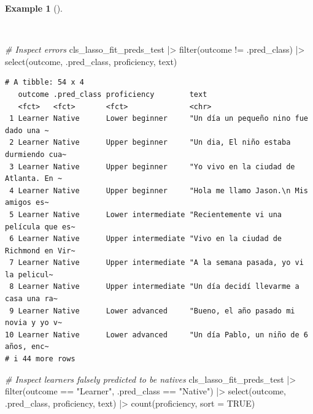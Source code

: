 \documentclass[
  letterpaper,
  krantz1]{latex/krantz-mod}
\newenvironment{Shaded}{\begin{snugshade}}{\end{snugshade}}
\newcommand{\AttributeTok}[1]{\textcolor[rgb]{0.00,0.00,0.00}{#1}}
\newcommand{\CommentTok}[1]{\textcolor[rgb]{0.00,0.00,0.00}{\textit{#1}}}
\newcommand{\ConstantTok}[1]{\textcolor[rgb]{0.00,0.00,0.00}{#1}}
\newcommand{\FunctionTok}[1]{\textcolor[rgb]{0.00,0.00,0.00}{#1}}
\newcommand{\NormalTok}[1]{\textcolor[rgb]{0.00,0.00,0.00}{#1}}
\newcommand{\SpecialCharTok}[1]{\textcolor[rgb]{0.00,0.00,0.00}{#1}}
\newcommand{\StringTok}[1]{\textcolor[rgb]{0.00,0.00,0.00}{#1}}
\theoremstyle{definition}
\theoremstyle{definition}
\newtheorem{example}{Example}[chapter]
\theoremstyle{remark}
\begin{document}
\begin{example}[]\protect\hypertarget{exm-predict-class-tune-hyperparameters-evaluate-test-errors}{}\label{exm-predict-class-tune-hyperparameters-evaluate-test-errors}

~

\begin{Shaded}
\begin{Highlighting}[numbers=left,,]
\CommentTok{\# Inspect errors}
\NormalTok{cls\_lasso\_fit\_preds\_test }\SpecialCharTok{|\textgreater{}}
  \FunctionTok{filter}\NormalTok{(outcome }\SpecialCharTok{!=}\NormalTok{ .pred\_class) }\SpecialCharTok{|\textgreater{}}
  \FunctionTok{select}\NormalTok{(outcome, .pred\_class, proficiency, text)}
\end{Highlighting}
\end{Shaded}

\begin{verbatim}
# A tibble: 54 x 4
   outcome .pred_class proficiency        text                                  
   <fct>   <fct>       <fct>              <chr>                                 
 1 Learner Native      Lower beginner     "Un día un pequeño nino fue dado una ~
 2 Learner Native      Upper beginner     "Un dia, El niño estaba durmiendo cua~
 3 Learner Native      Upper beginner     "Yo vivo en la ciudad de Atlanta. En ~
 4 Learner Native      Upper beginner     "Hola me llamo Jason.\n Mis amigos es~
 5 Learner Native      Lower intermediate "Recientemente vi una película que es~
 6 Learner Native      Upper intermediate "Vivo en la ciudad de Richmond en Vir~
 7 Learner Native      Upper intermediate "A la semana pasada, yo vi la pelicul~
 8 Learner Native      Upper intermediate "Un día decidí llevarme a casa una ra~
 9 Learner Native      Lower advanced     "Bueno, el año pasado mi novia y yo v~
10 Learner Native      Lower advanced     "Un día Pablo, un niño de 6 años, enc~
# i 44 more rows
\end{verbatim}

\begin{Shaded}
\begin{Highlighting}[numbers=left,,]
\CommentTok{\# Inspect learners falsely predicted to be natives}
\NormalTok{cls\_lasso\_fit\_preds\_test }\SpecialCharTok{|\textgreater{}}
  \FunctionTok{filter}\NormalTok{(outcome }\SpecialCharTok{==} \StringTok{"Learner"}\NormalTok{, .pred\_class }\SpecialCharTok{==} \StringTok{"Native"}\NormalTok{) }\SpecialCharTok{|\textgreater{}}
  \FunctionTok{select}\NormalTok{(outcome, .pred\_class, proficiency, text) }\SpecialCharTok{|\textgreater{}}
  \FunctionTok{count}\NormalTok{(proficiency, }\AttributeTok{sort =} \ConstantTok{TRUE}\NormalTok{)}
\end{Highlighting}
\end{Shaded}


\end{example}
\end{document}

